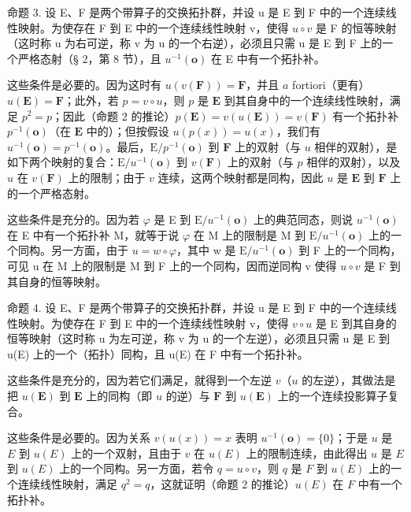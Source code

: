 命题 3. 设 E、F 是两个带算子的交换拓扑群，并设 u 是 E 到 F 中的一个连续线性映射。为使存在 F 到 E 中的一个连续线性映射 v，使得 \(u \circ v\) 是 F 的恒等映射（这时称 u 为右可逆，称 v 为 u 的一个右逆），必须且只需 u 是 E 到 F 上的一个严格态射（§ 2，第 8 节），且 \(u^{-1}(\mathbf{o})\) 在 E 中有一个拓扑补。

这些条件是必要的。因为这时有 \(u(v(\mathbf{F})) = \mathbf{F}\)，并且 \(a\) fortiori（更有）\(u(\mathbf{E}) = \mathbf{F}\)；此外，若 \(p = v \circ u\)，则 \(p\) 是 \(\mathbf{E}\) 到其自身中的一个连续线性映射，满足 \(p^2 = p\)；因此（命题 2 的推论）\(p(\mathbf{E}) = v(u(\mathbf{E})) = v(\mathbf{F})\) 有一个拓扑补 \(p^{-1}(\mathbf{o})\)（在 \(\mathbf{E}\) 中的）；但按假设 \(u(p(x)) = u(x)\)，我们有 \(u^{-1}(\mathbf{o}) = p^{-1}(\mathbf{o})\)。最后，\(\mathrm{E}/p^{-1}(\mathbf{o})\) 到 \(\mathbf{F}\) 上的双射（与 \(u\) 相伴的双射），是如下两个映射的复合：\(\mathrm{E}/u^{-1}(\mathbf{o})\) 到 \(v(\mathbf{F})\) 上的双射（与 \(p\) 相伴的双射），以及 \(u\) 在 \(v(\mathbf{F})\) 上的限制；由于 \(v\) 连续，这两个映射都是同构，因此 \(u\) 是 \(\mathbf{E}\) 到 \(\mathbf{F}\) 上的一个严格态射。

这些条件是充分的。因为若 \(\varphi\) 是 E 到 \(\mathrm{E}/u^{-1}(\mathbf{o})\) 上的典范同态，则说 \(u^{-1}(\mathbf{o})\) 在 E 中有一个拓扑补 M，就等于说 \(\varphi\) 在 M 上的限制是 M 到 \(\mathrm{E}/u^{-1}(\mathbf{o})\) 上的一个同构。另一方面，由于 \(u=w\circ\varphi\)，其中 w 是 \(\mathrm{E}/u^{-1}(\mathbf{o})\) 到 F 上的一个同构，可见 u 在 M 上的限制是 M 到 F 上的一个同构，因而逆同构 v 使得 \(u\circ v\) 是 F 到其自身的恒等映射。

命题 4. 设 E、F 是两个带算子的交换拓扑群，并设 u 是 E 到 F 中的一个连续线性映射。为使存在 F 到 E 中的一个连续线性映射 v，使得 \(v \circ u\) 是 E 到其自身的恒等映射（这时称 u 为左可逆，称 v 为 u 的一个左逆），必须且只需 u 是 E 到 u(E) 上的一个（拓扑）同构，且 u(E) 在 F 中有一个拓扑补。

这些条件是充分的，因为若它们满足，就得到一个左逆 \(v\)（\(u\) 的左逆），其做法是把 \(u(\mathbf{E})\) 到 \(\mathbf{E}\) 上的同构（即 \(u\) 的逆）与 \(\mathbf{F}\) 到 \(u(\mathbf{E})\) 上的一个连续投影算子复合。

这些条件是必要的。因为关系 \(v(u(x)) = x\) 表明 \(u^{-1}(\mathbf{o}) = \{0\}\)；于是 \(u\) 是 \(E\) 到 \(u(E)\) 上的一个双射，且由于 \(v\) 在 \(u(E)\) 上的限制连续，由此得出 \(u\) 是 \(E\) 到 \(u(E)\) 上的一个同构。另一方面，若令 \(q = u \circ v\)，则 \(q\) 是 \(F\) 到 \(u(E)\) 上的一个连续线性映射，满足 \(q^2 = q\)，这就证明（命题 2 的推论）\(u(E)\) 在 \(F\) 中有一个拓扑补。

